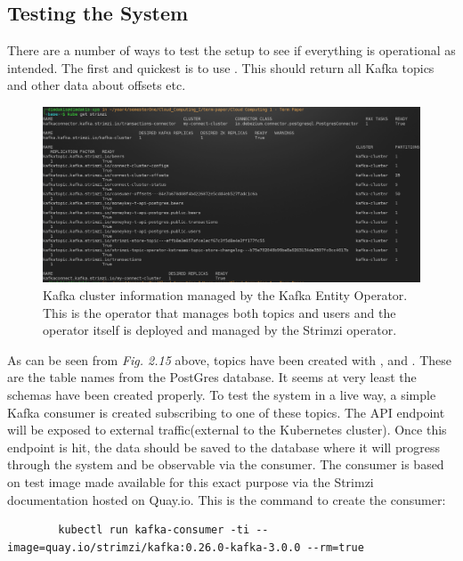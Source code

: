 \begin{flushleft}
    \section{Testing the System}
    There are a number of ways to test the setup to see if everything is operational as intended. The first and quickest is to use .
    This should return all Kafka topics and other data about offsets etc.
    \begin{figure} [ht]
        \begin{center}
            \includegraphics[width=1\textwidth]{figures/kube-get-strimzi.png}
            \caption{Kafka cluster information managed by the Kafka Entity Operator. This is the operator that manages both topics and users and the operator itself is
                deployed and managed by the Strimzi operator.}
            \label{fig: 2.15}
        \end{center}
    \end{figure}
    \newline As can be seen from \emph{Fig. 2.15} above, topics have been created with ,  and
    . These are the table names from the PostGres database. It seems at very least the schemas have been created properly.
    \bigbreak
    To test the system in a live way, a simple Kafka consumer is created subscribing to one of these topics. The API endpoint will be exposed to external
    traffic(external to the Kubernetes cluster). Once this endpoint is hit, the data should be saved to the database where it will progress through the system and
    be observable via the consumer. The consumer is based on test image made available for this exact purpose via the Strimzi documentation hosted on Quay.io.
    This is the command to create the consumer:
    \begin{lstlisting}
        kubectl run kafka-consumer -ti --image=quay.io/strimzi/kafka:0.26.0-kafka-3.0.0 --rm=true 

\end{lstlisting}
\end{flushleft}
